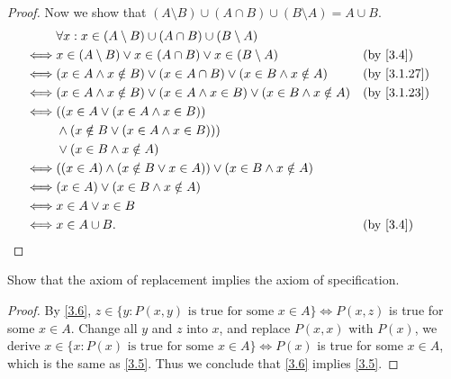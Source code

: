 \begin{proof}
  Now we show that \((A \setminus B) \cup (A \cap B) \cup (B \setminus A) = A \cup B\).
  \begin{align*}
         & \forall x : x \in (A \setminus B) \cup (A \cap B) \cup (B \setminus A)                                              \\
    \iff & x \in (A \setminus B) \lor x \in (A \cap B) \lor x \in (B \setminus A)                  &  & \text{(by \cref{3.4})} \\
    \iff & (x \in A \land x \notin B) \lor (x \in A \cap B) \lor (x \in B \land x \notin A)        &  & \by{3.1.27}            \\
    \iff & (x \in A \land x \notin B) \lor (x \in A \land x \in B) \lor (x \in B \land x \notin A) &  & \by{3.1.23}            \\
    \iff & ((x \in A \lor (x \in A \land x \in B))                                                                             \\
         & \land (x \notin B \lor (x \in A \land x \in B)))                                                                    \\
         & \lor (x \in B \land x \notin A)                                                                                     \\
    \iff & ((x \in A) \land (x \notin B \lor x \in A)) \lor (x \in B \land x \notin A)                                         \\
    \iff & (x \in A) \lor (x \in B \land x \notin A)                                                                           \\
    \iff & x \in A \lor x \in B                                                                                                \\
    \iff & x \in A \cup B.                                                                         &  & \text{(by \cref{3.4})}
  \end{align*}
\end{proof}

\begin{ex}\label{ex:3.1.11}
  Show that the axiom of replacement implies the axiom of specification.
\end{ex}

\begin{proof}
  By \cref{3.6}, \(z \in \{y : P(x, y) \text{ is true for some } x \in A\} \iff P(x, z)\) is true for some \(x \in A\).
  Change all \(y\) and \(z\) into \(x\), and replace \(P(x, x)\) with \(P(x)\), we derive \(x \in \{x : P(x) \text{ is true for some } x \in A\} \iff P(x)\) is true for some \(x \in A\), which is the same as \cref{3.5}.
  Thus we conclude that \cref{3.6} implies \cref{3.5}.
\end{proof}